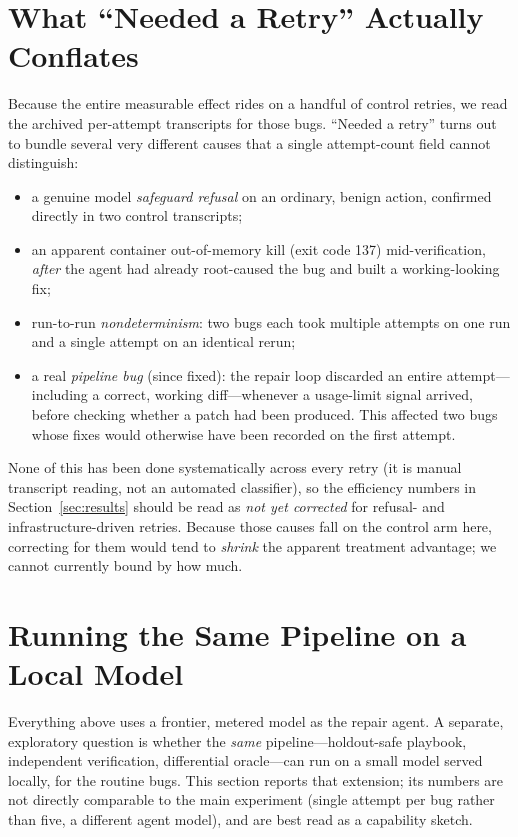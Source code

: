 \documentclass[11pt]{article}
\begin{document}
\section{What ``Needed a Retry'' Actually Conflates}
\label{sec:retry}

Because the entire measurable effect rides on a handful of control retries, we read
the archived per-attempt transcripts for those bugs. ``Needed a retry'' turns out
to bundle several very different causes that a single attempt-count field cannot
distinguish:
\begin{itemize}
  \item a genuine model \emph{safeguard refusal} on an ordinary, benign action,
  confirmed directly in two control transcripts;
  \item an apparent container out-of-memory kill (exit code 137) mid-verification,
  \emph{after} the agent had already root-caused the bug and built a working-looking
  fix;
  \item run-to-run \emph{nondeterminism}: two bugs each took multiple attempts on
  one run and a single attempt on an identical rerun;
  \item a real \emph{pipeline bug} (since fixed): the repair loop discarded an
  entire attempt---including a correct, working diff---whenever a usage-limit
  signal arrived, before checking whether a patch had been produced. This affected
  two bugs whose fixes would otherwise have been recorded on the first attempt.
\end{itemize}
None of this has been done systematically across every retry (it is manual
transcript reading, not an automated classifier), so the efficiency numbers in
Section~\ref{sec:results} should be read as \emph{not yet corrected} for
refusal- and infrastructure-driven retries. Because those causes fall on the
control arm here, correcting for them would tend to \emph{shrink} the apparent
treatment advantage; we cannot currently bound by how much.

\section{Running the Same Pipeline on a Local Model}
\label{sec:local}

Everything above uses a frontier, metered model as the repair agent. A separate,
exploratory question is whether the \emph{same} pipeline---holdout-safe playbook,
independent verification, differential oracle---can run on a small model served
locally, for the routine bugs. This section reports that extension; its numbers
are not directly comparable to the main experiment (single attempt per bug rather
than five, a different agent model), and are best read as a capability sketch.
\end{document}
